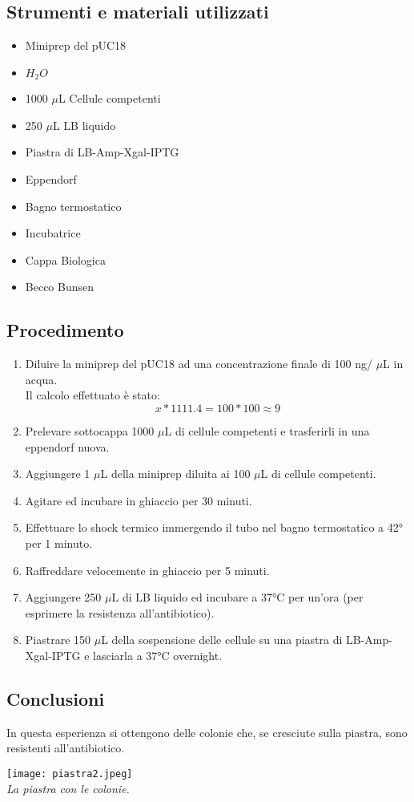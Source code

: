 \documentclass{extarticle}
\begin{document}
\subsection*{Strumenti e materiali utilizzati}
\begin{itemize}
    \item Miniprep del pUC18
    \item $H_{2}O$
    \item 1000 $\mu$L Cellule competenti
    \item 250 $\mu$L LB liquido
    \item Piastra di LB-Amp-Xgal-IPTG
    \item Eppendorf
    \item Bagno termostatico
    \item Incubatrice
    \item Cappa Biologica
    \item Becco Bunsen
\end{itemize}
\subsection*{Procedimento}
\begin{enumerate}
    \item Diluire la miniprep del pUC18 ad una concentrazione finale di 100 ng/ $\mu$L in acqua.\\
    Il calcolo effettuato è stato: $$x*1111.4 = 100*100 \approx 9 $$
    \item Prelevare sottocappa 1000 $\mu$L di cellule competenti e trasferirli in una eppendorf nuova.
    \item Aggiungere 1 $\mu$L della miniprep diluita ai 100 $\mu$L di cellule competenti.
    \item Agitare ed incubare in ghiaccio per 30 minuti.
    \item Effettuare lo shock termico immergendo il tubo nel bagno termostatico a 42° per 1 minuto.
    \item Raffreddare velocemente in ghiaccio per 5 minuti.
    \item Aggiungere 250 $\mu$L di LB liquido ed incubare a 37°C per un'ora (per esprimere la resistenza all'antibiotico).
    \item Piastrare 150 $\mu$L della sospensione delle cellule su una piastra di LB-Amp-Xgal-IPTG e lasciarla a 37°C overnight.
\end{enumerate}
\subsection*{Conclusioni}
In questa esperienza si ottengono delle colonie che, se cresciute sulla piastra, sono resistenti all'antibiotico.
\begin{center}
    \texttt{[image: piastra2.jpeg]}\\
    \emph{La piastra con le colonie.}
\end{center}
\end{document}
